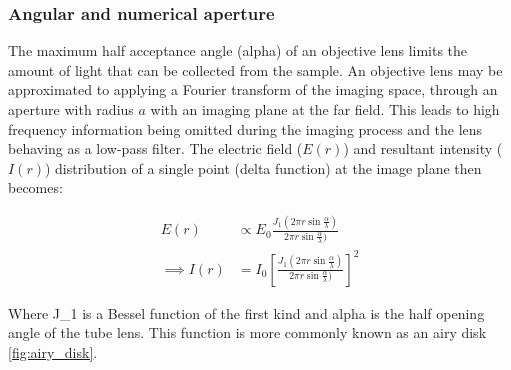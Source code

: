 \subsubsection{Angular and numerical aperture}

The maximum half acceptance angle (\gls{alpha}) of an \gls{objective lens} limits the amount of light that can be collected from the sample.
An \gls{objective lens} may be approximated to applying a Fourier transform of the imaging space, through an aperture with radius $a$ with an imaging plane at the far field.
This leads to high frequency information being omitted during the imaging process and the lens behaving as a low-pass filter.
The electric field ($E(r)$) and resultant intensity ($I(r)$) distribution of a single point (delta function) at the image plane then becomes:

\begin{align}
    E(r) &\propto E_0 \frac{J_1 \left(2\pi r \sin \frac{\alpha}{\lambda}\right)}{2\pi r \sin \frac{\alpha}{\lambda})}\label{eq:E_airy}\\
    \implies
    I(r) &= I_0 \left[\frac{J_1 \left(2\pi r \sin \frac{\alpha}{\lambda}\right)}{2\pi r \sin \frac{\alpha}{\lambda})}\right]^2\label{eq:I_airy}
\end{align}

Where \gls{J_1} is a Bessel function of the first kind and \gls{alpha} is the half opening angle of the tube lens.
This function is more commonly known as an \Gls{airy disk} \ref{fig:airy_disk}.

